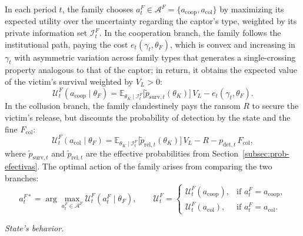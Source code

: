 \documentclass[review,authoryear,12pt]{elsarticle}
\theoremstyle{plain}
\theoremstyle{definition}
\newcommand{\E}{\mathbb{E}}
\newcommand{\1}{\mathbf{1}}
\begin{document}
\noindent In each period $t$, the family chooses $a_t^F\in\mathcal{A}^F=\{a_{\mathrm{coop}},a_{\mathrm{col}}\}$ by maximizing its expected utility over the uncertainty regarding the captor's type, weighted by its private information set $\mathcal{I}_t^F$. In the cooperation branch, the family follows the institutional path, paying the cost $e_t(\gamma_t,\theta_F)$, which is convex and increasing in $\gamma_t$ with asymmetric variation across family types that generates a single-crossing property analogous to that of the captor; in return, it obtains the expected value of the victim's survival weighted by $V_L>0$:
\begin{equation}
\mathcal{U}^F_t(a_{\mathrm{coop}}\mid\theta_F)=\E_{\theta_K\mid\mathcal{I}_t^F}\!\bigl[\tilde{p}_{\mathrm{surv},t}(\theta_K)\bigr]\,V_L-e_t(\gamma_t,\theta_F).
\label{eq:f-coop}
\end{equation}
In the collusion branch, the family clandestinely pays the ransom $R$ to secure the victim's release, but discounts the probability of detection by the state and the fine $F_{\mathrm{col}}$:
\begin{equation}
\mathcal{U}^F_t(a_{\mathrm{col}}\mid\theta_F)=\E_{\theta_K\mid\mathcal{I}_t^F}\!\bigl[\tilde{p}_{\mathrm{rel},t}(\theta_K)\bigr]\,V_L-R-p_{\mathrm{det},t}\,F_{\mathrm{col}},
\label{eq:f-col}
\end{equation}
where $\tilde{p}_{\mathrm{surv},t}$ and $\tilde{p}_{\mathrm{rel},t}$ are the effective probabilities from Section~\ref{subsec:prob-efectivas}. The optimal action of the family arises from comparing the two branches:
\begin{equation}
a_t^{F\ast}=\arg\max_{a_t^F\in\mathcal{A}^F}\mathcal{U}^F_t(a_t^F\mid\theta_F),\qquad
\mathcal{U}^F_t=\begin{cases}\mathcal{U}^F_t(a_{\mathrm{coop}}), & \text{if }a_t^F=a_{\mathrm{coop}},\\\mathcal{U}^F_t(a_{\mathrm{col}}), & \text{if }a_t^F=a_{\mathrm{col}}.\end{cases}
\label{eq:f-argmax}
\end{equation}

\noindent\textit{State's behavior.}
\end{document}
